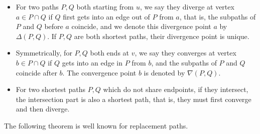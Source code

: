 \documentclass[11pt]{article}
\theoremstyle{plain}
\theoremstyle{definition}
\begin{document}
\begin{itemize}
    \item For two paths $P,Q$ both starting from $u$, we say they diverge at vertex $a \in P\cap Q$ if $Q$ first gets into an edge out of $P$ from $a$, that is, the subpaths of $P$ and $Q$ before $a$ coincide, and we denote this divergence point $a$ by $\Delta(P,Q)$. If $P,Q$ are both shortest paths, their divergence point is unique.
    
    \item Symmetrically, for $P,Q$ both ends at $v$, we say they converges at vertex $b \in P\cap Q$ if $Q$ gets into an edge in $P$ from $b$, and the subpaths of $P$ and $Q$ coincide after $b$. The convergence point $b$ is denoted by $\nabla(P,Q)$. 

    \item For two shortest paths $P,Q$ which do not share endpoints, if they intersect, the intersection part is also a shortest path, that is, they must first converge and then diverge.
\end{itemize}

The following theorem is well known for replacement paths. 
\end{document}
